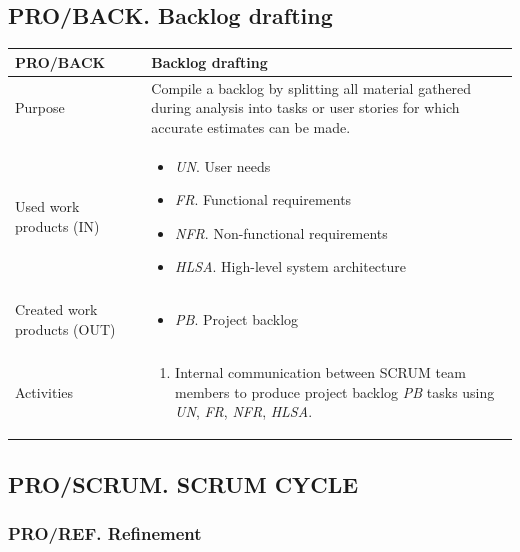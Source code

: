 \subsection{PRO/BACK. Backlog drafting} %
\begin{table}[h!]
\begin{tabular}{l|p{}}
\hline
\textbf{PRO/BACK}        & \textbf{Backlog drafting} \\ \hline
Purpose & Compile a backlog by splitting all material gathered during analysis into tasks or user stories for which accurate estimates can be made.  \\ \hline
Used work products (IN)&      
\begin{itemize}
    \item \textit{UN}. User needs
    \item \textit{FR}. Functional requirements
    \item \textit{NFR}. Non-functional requirements
    \item \textit{HLSA}. High-level system architecture 
\end{itemize}
\\ \hline
Created work products (OUT)&     
\begin{itemize}
    \item \textit{PB}. Project backlog
\end{itemize}
\\ \hline
Activities            &   
\begin{enumerate}
    \item Internal communication between SCRUM team members to produce project backlog \textit{PB} tasks using \textit{UN}, \textit{FR}, \textit{NFR}, \textit{HLSA}.
\end{enumerate}
\\ \hline
\end{tabular}

\label{pro/back}
\end{table}

\newpage
\subsection{PRO/SCRUM. SCRUM CYCLE }

\subsubsection{PRO/REF. Refinement }

